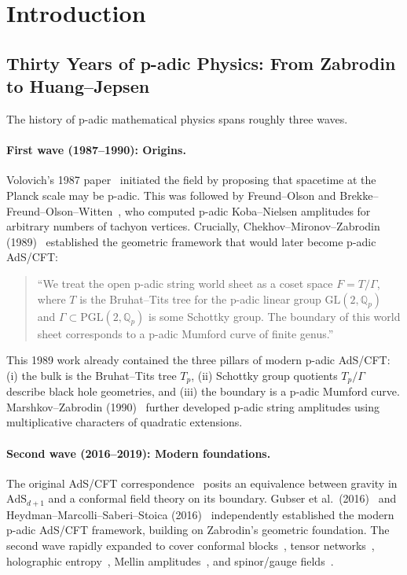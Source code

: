 \documentclass[11pt,a4paper]{article}
\newcommand{\Qp}{\mathbb{Q}_p}
\newcommand{\Tp}{T_p}
\newcommand{\PGL}{\mathrm{PGL}}
\newcommand{\GL}{\mathrm{GL}}
\newcommand{\AdS}{\mathrm{AdS}}
\newcommand{\BirTits}{Bruhat--Tits}
\begin{document}
\tableofcontents
\newpage

\section{Introduction}
\label{sec:intro}

\subsection{Thirty Years of p-adic Physics: From Zabrodin to Huang--Jepsen}

The history of p-adic mathematical physics spans roughly three waves.

\paragraph{First wave (1987--1990): Origins.}
Volovich's 1987 paper~\cite{V87} initiated the field by proposing that spacetime at the Planck scale may be p-adic. This was followed by Freund--Olson and Brekke--Freund--Olson--Witten~\cite{BFO88}, who computed p-adic Koba--Nielsen amplitudes for arbitrary numbers of tachyon vertices. Crucially, Chekhov--Mironov--Zabrodin (1989)~\cite{CMZ89} established the geometric framework that would later become p-adic AdS/CFT:

\begin{quote}
``We treat the open p-adic string world sheet as a coset space $F = T/\Gamma$, where $T$ is the \BirTits{} tree for the p-adic linear group $\GL(2, \Qp)$ and $\Gamma \subset \PGL(2, \Qp)$ is some Schottky group. The boundary of this world sheet corresponds to a p-adic Mumford curve of finite genus.''
\end{quote}

This 1989 work already contained the three pillars of modern p-adic AdS/CFT: (i) the bulk is the \BirTits{} tree $\Tp$, (ii) Schottky group quotients $\Tp/\Gamma$ describe black hole geometries, and (iii) the boundary is a p-adic Mumford curve. Marshkov--Zabrodin (1990)~\cite{MZ90} further developed p-adic string amplitudes using multiplicative characters of quadratic extensions.

\paragraph{Second wave (2016--2019): Modern foundations.}
The original AdS/CFT correspondence~\cite{M97,GKP98,W98} posits an equivalence between gravity in $\AdS_{d+1}$ and a conformal field theory on its boundary. Gubser et al.\ (2016)~\cite{G16} and Heydman--Marcolli--Saberi--Stoica (2016)~\cite{HMSS16} independently established the modern p-adic AdS/CFT framework, building on Zabrodin's geometric foundation. The second wave rapidly expanded to cover conformal blocks~\cite{P19,JP19a}, tensor networks~\cite{HLM19}, holographic entropy~\cite{HMPS18}, Mellin amplitudes~\cite{JP19b}, and spinor/gauge fields~\cite{GJT19,HLM19b}.
\end{document}
